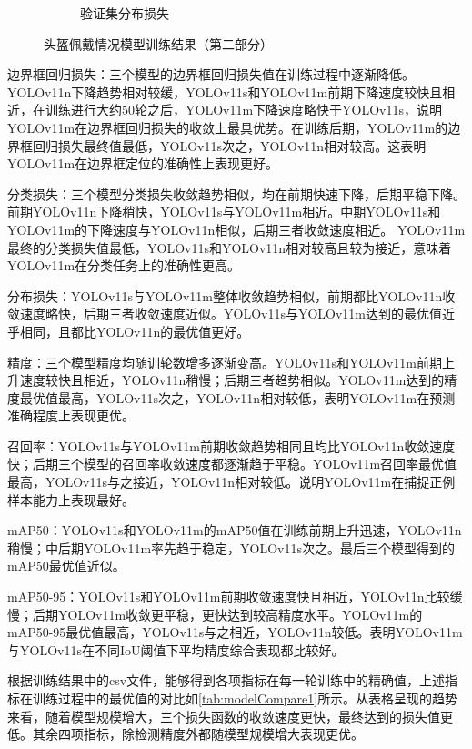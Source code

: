 \begin{figure}[H]
\begin{subfigure}[t]{0.43\textwidth}
        \caption{验证集分布损失}
        \label{fig:helmet_val_dfl_loss}
    \end{subfigure}
    \caption{头盔佩戴情况模型训练结果（第二部分）}
    \label{fig:helmetResult_part2}
\end{figure}

边界框回归损失：三个模型的边界框回归损失值在训练过程中逐渐降低。YOLOv11n下降趋势相对较缓，YOLOv11s和YOLOv11m前期下降速度较快且相近，在训练进行大约50轮之后，YOLOv11m下降速度略快于YOLOv11s，说明YOLOv11m在边界框回归损失的收敛上最具优势。在训练后期，YOLOv11m的边界框回归损失最终值最低，YOLOv11s次之，YOLOv11n相对较高。这表明YOLOv11m在边界框定位的准确性上表现更好。

分类损失：三个模型分类损失收敛趋势相似，均在前期快速下降，后期平稳下降。前期YOLOv11n下降稍快，YOLOv11s与YOLOv11m相近。中期YOLOv11s和YOLOv11m的下降速度与YOLOv11n相似，后期三者收敛速度相近。
YOLOv11m最终的分类损失值最低，YOLOv11s和YOLOv11n相对较高且较为接近，意味着YOLOv11m在分类任务上的准确性更高。

分布损失：YOLOv11s与YOLOv11m整体收敛趋势相似，前期都比YOLOv11n收敛速度略快，后期三者收敛速度近似。YOLOv11s与YOLOv11m达到的最优值近乎相同，且都比YOLOv11n的最优值更好。

精度：三个模型精度均随训轮数增多逐渐变高。YOLOv11s和YOLOv11m前期上升速度较快且相近，YOLOv11n稍慢；后期三者趋势相似。YOLOv11m达到的精度最优值最高，YOLOv11s次之，YOLOv11n相对较低，表明YOLOv11m在预测准确程度上表现更优。

召回率：YOLOv11s与YOLOv11m前期收敛趋势相同且均比YOLOv11n收敛速度快；后期三个模型的召回率收敛速度都逐渐趋于平稳。YOLOv11m召回率最优值最高，YOLOv11s与之接近，YOLOv11n相对较低。说明YOLOv11m在捕捉正例样本能力上表现最好。

mAP50：YOLOv11s和YOLOv11m的mAP50值在训练前期上升迅速，YOLOv11n稍慢；中后期YOLOv11m率先趋于稳定，YOLOv11s次之。最后三个模型得到的mAP50最优值近似。

mAP50-95：YOLOv11s和YOLOv11m前期收敛速度快且相近，YOLOv11n比较缓慢；后期YOLOv11m收敛更平稳，更快达到较高精度水平。YOLOv11m的mAP50-95最优值最高，YOLOv11s与之相近，YOLOv11n较低。表明YOLOv11m与YOLOv11s在不同IoU阈值下平均精度综合表现都比较好。

根据训练结果中的csv文件，能够得到各项指标在每一轮训练中的精确值，上述指标在训练过程中的最优值的对比如\ref{tab:modelCompare1}所示。从表格呈现的趋势来看，随着模型规模增大，三个损失函数的收敛速度更快，最终达到的损失值更低。其余四项指标，除检测精度外都随模型规模增大表现更优。

